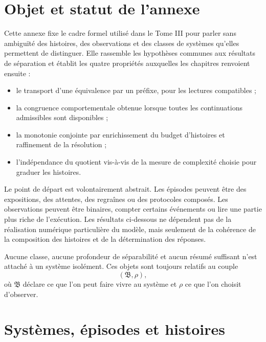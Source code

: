 \section{Objet et statut de l'annexe}
\label{annexe-histoires-objet}

Cette annexe fixe le cadre formel utilisé dans le Tome III pour parler
sans ambiguïté des histoires, des observations et des classes de
systèmes qu'elles permettent de distinguer. Elle rassemble les
hypothèses communes aux résultats de séparation et établit les quatre
propriétés auxquelles les chapitres renvoient ensuite :

\begin{itemize}
\item
  le transport d'une équivalence par un préfixe, pour les lectures compatibles ;
\item
  la congruence comportementale obtenue lorsque toutes les
  continuations admissibles sont disponibles ;
\item
  la monotonie conjointe par enrichissement du budget d'histoires et
  raffinement de la résolution ;
\item
  l'indépendance du quotient vis-à-vis de la mesure de complexité
  choisie pour graduer les histoires.
\end{itemize}

Le point de départ est volontairement abstrait. Les épisodes peuvent
être des expositions, des attentes, des regraînes ou des protocoles
composés. Les observations peuvent être binaires, compter certains
événements ou lire une partie plus riche de l'exécution. Les résultats
ci-dessous ne dépendent pas de la réalisation numérique particulière
du modèle, mais seulement de la cohérence de la composition des
histoires et de la détermination des réponses.

\begin{encadre}[title={Principe de relativité observationnelle}]
Aucune classe, aucune profondeur de séparabilité et aucun résumé suffisant
n'est attaché à un système isolément. Ces objets sont toujours relatifs
au couple
\[
(\mathfrak B,\rho),
\]
où \(\mathfrak B\) déclare ce que l'on peut faire vivre au système et
\(\rho\) ce que l'on choisit d'observer.
\end{encadre}

\section{Systèmes, épisodes et histoires}
\label{annexe-histoires-monoide}

